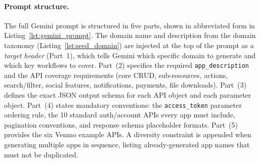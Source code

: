 \documentclass[11pt]{article}
\begin{document}
\paragraph{Prompt structure.}
The full Gemini prompt is structured in five parts, shown in abbreviated form in Listing~\ref{lst:gemini_prompt}. The domain name and description from the domain taxonomy (Listing~\ref{lst:seed_domain}) are injected at the top of the prompt as a \emph{target header} (Part~1), which tells Gemini which specific domain to generate and which key workflows to cover. Part~(2) specifies the required \texttt{app\_description} and the API coverage requirements (core CRUD, sub-resources, actions, search/filter, social features, notifications, payments, file downloads). Part~(3) defines the exact JSON output schema for each API object and each parameter object. Part~(4) states mandatory conventions: the \texttt{access\_token} parameter ordering rule, the 10 standard auth/account APIs every app must include, pagination conventions, and response schema placeholder formats. Part~(5) provides the six Venmo example APIs. A diversity constraint is appended when generating multiple apps in sequence, listing already-generated app names that must not be duplicated.
\end{document}
